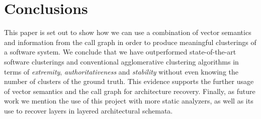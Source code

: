 \documentclass[sigconf,review, anonymous]{acmart}
\begin{document}
\section{Conclusions} 

This paper is set out to show how we can use a combination of vector semantics
and information from the call graph in order to produce meaningful clusterings of a software system.
We conclude that we have outperformed state-of-the-art software clusterings and conventional
agglomerative clustering algorithms 
in terms of \emph{extremity}, \emph{authoritativeness} and \emph{stability} 
without even knowing the number of clusters of the ground truth. This evidence 
supports the further usage of vector semantics and the call graph for architecture recovery.
Finally, as future work we mention the use of this project 
with more static analyzers, as well as its use to recover layers in layered
architectural schemata.



\newpage


\end{document}
